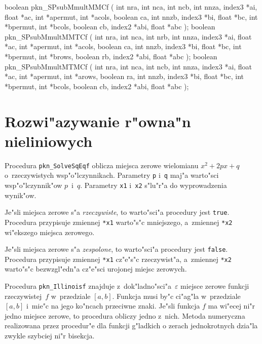 \begin{listingC}
boolean pkn_SPsubMmultMMCf ( int nra, int nca, int ncb,
                             int nnza, index3 *ai, float *ac,
                             int *apermut, int *acols, boolean ca,
                             int nnzb, index3 *bi, float *bc,
                             int *bpermut, int *bcols, boolean cb,
                             index2 *abi, float *abc );
boolean pkn_SPsubMmultMMTCf ( int nra, int nca, int nrb,
                              int nnza, index3 *ai, float *ac,
                              int *apermut, int *acols, boolean ca,
                              int nnzb, index3 *bi, float *bc,
                              int *bpermut, int *brows, boolean rb,
                              index2 *abi, float *abc );
boolean pkn_SPsubMmultMTMCf ( int nra, int nca, int ncb,
                              int nnza, index3 *ai, float *ac,
                              int *apermut, int *arows, boolean ra,
                              int nnzb, index3 *bi, float *bc,
                              int *bpermut, int *bcols, boolean cb,
                              index2 *abi, float *abc );
\end{listingC}



\newpage
\section{Rozwi"azywanie r"owna"n nieliniowych}

\hspace*{\parindent}Procedura \texttt{pkn\_SolveSqEqf} oblicza miejsca
zerowe wielomianu $x^2+2px+q$ o~rzeczywistych wsp"o"lczynnikach.
Parametry \texttt{p} i~\texttt{q} maj"a warto"sci wsp"o"lczynnik"ow
$p$~i~$q$. Parametry \texttt{x1} i~\texttt{x2} s"lu"r"a do wyprowadzenia
wynik"ow.

Je"sli miejsca zerowe s"a \emph{rzeczywiste}, to warto"sci"a procedury jest
\texttt{true}. Procedura przypisuje zmiennej \texttt{*x1} warto"s"c
mniejszego, a~zmiennej \texttt{*x2} wi"ekszego miejsca zerowego.

Je"sli miejsca zerowe s"a \emph{zespolone}, to warto"sci"a procedury jest
\texttt{false}. Procedura przypisuje zmiennej \texttt{*x1} cz"e"s"c
rzeczywist"a, a~zmiennej \texttt{*x2} warto"s"c bezwzgl"edn"a cz"e"sci
urojonej miejsc zerowych.

\vspace{\bigskipamount}
\begin{sloppypar}
Procedura \texttt{pkn\_Illinoisf} znajduje
z~dok"ladno"sci"a~$\varepsilon$ miejsce
zerowe funkcji rzeczywistej~$f$ w~przedziale $[a,b]$.
Funkcja musi by"c ci"ag"la w~przedziale $[a,b]$ i~mie"c na jego ko"ncach
przeciwne znaki. Je"sli funkcja $f$ ma wi"ecej ni"r jedno miejsce zerowe, to
procedura obliczy jedno z~nich. Metoda numeryczna realizowana przez
procedur"e dla funkcji g"ladkich o zerach jednokrotnych dzia"la zwykle
szybciej ni"r bisekcja.
\end{sloppypar}

